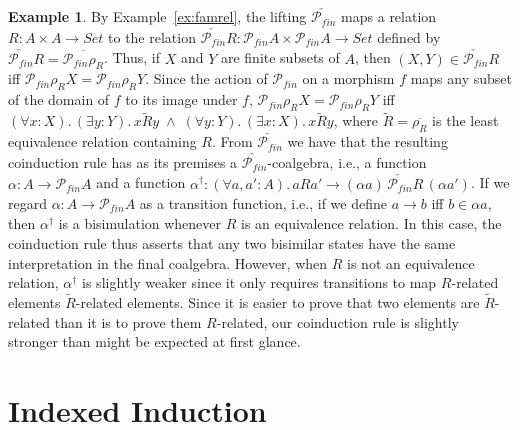 \documentclass{LMCS}
\newcommand{\ra}{\rightarrow}
\newcommand{\hash}{\dagger}
\newcommand\Ps{\mathscr{P}}
\newcommand\Pfi{\Ps\!\!{}_{\mathit{fin}}}
\theoremstyle{plain}
\theoremstyle{remark}
\theoremstyle{definition}
\newtheorem{example}[theorem]{Example}
\begin{document}
\begin{example}\label{ex:coind}
  By Example~\ref{ex:famrel}, the lifting $\check{\Pfi}$ maps a
  relation $R:A \times A \ra Set$ to the relation $\check{\Pfi}R: \Pfi
  A \times \Pfi A \ra Set$ defined by $\check{\Pfi} R = \overline{\Pfi
    \rho_R}$. Thus, if $X$ and $Y$ are finite subsets of $A$, then $(X
  , Y) \in \check{\Pfi} R$ iff $\Pfi \rho_R X = \Pfi \rho_R Y$. Since
  the action of $\Pfi$ on a morphism $f$ maps any subset of the domain
  of $f$ to its image under $f$, $\Pfi \rho_R X = \Pfi \rho_R Y$ iff
  $(\forall x:X).\,(\exists y:Y).\, x\tilde{R}y \;\wedge\; (\forall
  y:Y).\, (\exists x:X).\,x\tilde{R}y$, where
  $\tilde{R}=\overline{\rho_R}$ is the least equivalence relation
  containing $R$. From $\check{\Pfi}$ we have that the resulting
  coinduction rule has as its premises a $\check{\Pfi}$-coalgebra,
  i.e., a function $\alpha: A \ra \Pfi A$ and a function $\alpha^\hash
  : (\forall a, a': A). \, aRa' \to (\alpha a) \, \check{\Pfi} R \,
  (\alpha a')$. If we regard $\alpha : A \ra \Pfi A$ as a transition
  function, i.e., if we define $a \ra b$ iff $b \in \alpha a$, then
  $\alpha^\hash$ is a bisimulation whenever $R$ is an equivalence
  relation. In this case, the coinduction rule thus asserts that any
  two bisimilar states have the same interpretation in the final
  coalgebra.  However, when $R$ is not an equivalence relation,
  $\alpha^\hash$ is slightly weaker since it only requires
  transitions to map $R$-related elements $\tilde{R}$-related
  elements.  Since it is easier to prove that two elements are $\tilde
  R$-related than it is to prove them $R$-related, our coinduction
  rule is slightly stronger than might be expected at first glance.
\end{example}

\section{Indexed Induction}\label{sec:indind}
\end{document}
